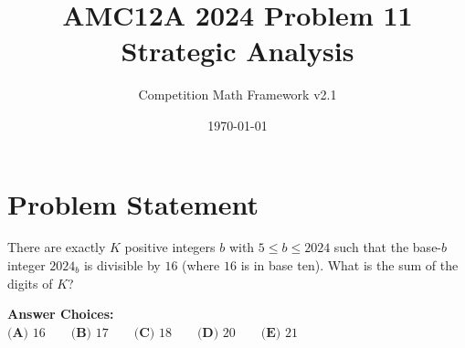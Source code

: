 \documentclass[11pt]{article}
\begin{document}
\title{\textbf{AMC12A 2024 Problem 11\\Strategic Analysis}}
\author{Competition Math Framework v2.1}
\date{\today}
\maketitle

\section*{Problem Statement}

There are exactly $K$ positive integers $b$ with $5 \leq b \leq 2024$ such that the base-$b$ integer $2024_b$ is divisible by $16$ (where $16$ is in base ten). What is the sum of the digits of $K$?

\vspace{0.5em}
\textbf{Answer Choices:}\\
$\textbf{(A) }16\qquad\textbf{(B) }17\qquad\textbf{(C) }18\qquad\textbf{(D) }20\qquad\textbf{(E) }21$
\end{document}
